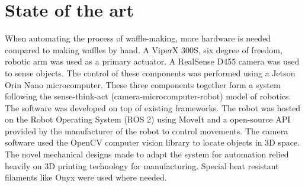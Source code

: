 \section{State of the art}

When automating the process of waffle-making, more hardware is needed compared to making waffles by hand. A ViperX 300S, six degree of freedom, robotic arm was used as a primary actuator. A RealSense D455 camera was used to sense objects. The control of these components was performed using a Jetson Orin Nano microcomputer. These three components together form a system following the sense-think-act (camera-microcomputer-robot) model of robotics. \\

The software was developed on top of existing frameworks. The robot was hosted on the Robot Operating System (ROS 2) using MoveIt and a open-source API provided by the manufacturer of the robot to control movements. The camera software used the OpenCV computer vision library to locate objects in 3D space. 
The novel mechanical designs made to adapt the system for automation relied heavily on 3D printing technology for manufacturing. Special heat resistant filaments like Onyx were used where needed. 

